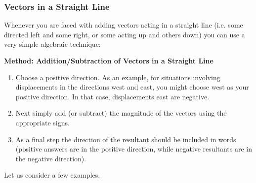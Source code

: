 \subsubsection*{Vectors in a Straight Line}

Whenever you are faced with adding vectors acting in a straight line (i.e. some directed left and some right, or some acting up and others down) you can use a very simple algebraic technique:\\

\begin{minipage}{\textwidth}
\textbf{Method: Addition/Subtraction of Vectors in a Straight Line}
\begin{enumerate}[noitemsep, label=\textbf{\arabic*}.]
\item{Choose a positive direction. As an example, for
situations involving displacements in the directions west and east, you
might choose west as your positive direction. In that case,
displacements east are negative.}
\item{Next simply add (or subtract) the
magnitude of the vectors using the appropriate signs.}
\item{As a final step the direction of the resultant should be included in
words (positive answers are in the positive direction, while negative
resultants are in the negative direction).}\\
\end{enumerate}
\end{minipage}

Let us consider a few examples. 

